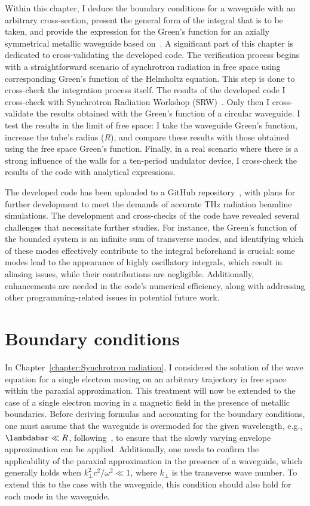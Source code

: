     Within this chapter, I deduce the boundary conditions for a waveguide with an arbitrary cross-section, present the general form of the integral that is to be taken, and provide the expression for the Green's function for an axially symmetrical metallic waveguide based on~. A significant part of this chapter is dedicated to cross-validating the developed code. The verification process begins with a straightforward scenario of synchrotron radiation in free space using corresponding Green's function of the Helmholtz equation. This step is done to cross-check the integration process itself. The results of the developed code I cross-check with Synchrotron Radiation Workshop (SRW)~. Only then I cross-validate the results obtained with the Green's function of a circular waveguide. I test the results in the limit of free space: I take the waveguide Green's function, increase the tube's radius ($R$), and compare these results with those obtained using the free space Green's function. Finally, in a real scenario where there is a strong influence of the walls for a ten-period undulator device, I cross-check the results of the code with analytical expressions.
    
    The developed code has been uploaded to a GitHub repository~, with plans for further development to meet the demands of accurate THz radiation beamline simulations. The development and cross-checks of the code have revealed several challenges that necessitate further studies. For instance, the Green's function of the bounded system is an infinite sum of transverse modes, and identifying which of these modes effectively contribute to the integral beforehand is crucial: some modes lead to the appearance of highly oscillatory integrals, which result in aliasing issues, while their contributions are negligible. Additionally, enhancements are needed in the code's numerical efficiency, along with addressing other programming-related issues in potential future work.
    
\section{Boundary conditions}
    
    In Chapter~\ref{chapter:Synchrotron radiation}, I considered the solution of the wave equation for a single electron moving on an arbitrary trajectory in free space within the paraxial approximation. This treatment will now be extended to the case of a single electron moving in a magnetic field in the presence of  metallic boundaries. Before deriving formulas and accounting for the boundary conditions, one must assume that the waveguide is overmoded for the given wavelength, e.g., $\lambdabar \ll R$, following~, to ensure that the slowly varying envelope approximation can be applied. Additionally, one needs to confirm the applicability of the paraxial approximation in the presence of a waveguide, which generally holds when $k_{\perp}^2 c^2 / \omega^2 \ll 1$, where $k_{\perp}$ is the transverse wave number. To extend this to the case with the waveguide, this condition should also hold for each mode in the waveguide.
    
